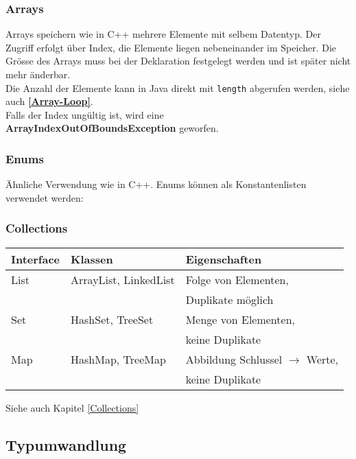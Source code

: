 \subsubsection{Arrays}
Arrays speichern wie in C++ mehrere Elemente mit selbem Datentyp. Der Zugriff erfolgt über Index, die Elemente liegen nebeneinander im Speicher.
Die Grösse des Arrays muss bei der Deklaration festgelegt werden und ist später nicht mehr änderbar.\\
Die Anzahl der Elemente kann in Java direkt mit \verb|length| abgerufen werden, siehe auch \textbf{\ref{Array-Loop}}.\\
Falls der Index ungültig ist, wird eine\\
\textbf{ArrayIndexOutOfBoundsException} geworfen.

\subsubsection{Enums}
Ähnliche Verwendung wie in C++. Enums können als Konstantenlisten verwendet werden:


\subsubsection{Collections}
\begin{center}
    \begin{tabular}{lll}
        \rowcolor[RGB]{239,239,239} 
        \textbf{Interface} & \textbf{Klassen} & \textbf{Eigenschaften} \\ \hline
        List & ArrayList, LinkedList & Folge von Elementen, \\
             &                       & Duplikate möglich\\
        \hline
        Set  & HashSet, TreeSet & Menge von Elementen, \\
             &                       & keine Duplikate \\
        \hline
        Map  & HashMap, TreeMap & Abbildung Schlussel $\rightarrow$ Werte, \\
        &                       & keine Duplikate \\
    \end{tabular}
\end{center}

Siehe auch Kapitel \ref{Collections} 

\subsection{Typumwandlung}

